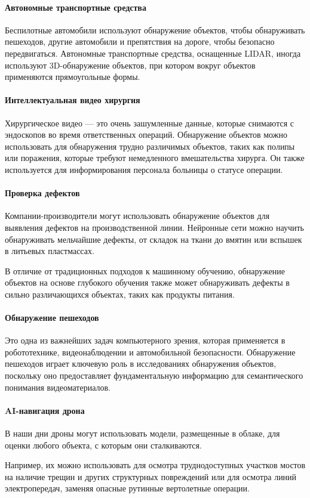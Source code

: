\paragraph{Автономные транспортные средства}
Беспилотные автомобили используют обнаружение объектов, чтобы обнаруживать пешеходов, другие автомобили и препятствия на дороге, чтобы безопасно передвигаться. Автономные транспортные средства, оснащенные LIDAR, иногда используют 3D-обнаружение объектов, при котором вокруг объектов применяются прямоугольные формы.

\paragraph{Интеллектуальная видео хирургия}
Хирургическое видео — это очень зашумленные данные, которые снимаются с эндоскопов во время ответственных операций. Обнаружение объектов можно использовать для обнаружения трудно различимых объектов, таких как полипы или поражения, которые требуют немедленного вмешательства хирурга. Он также используется для информирования персонала больницы о статусе операции.

\paragraph{Проверка дефектов}
Компании-производители могут использовать обнаружение объектов для выявления дефектов на производственной линии. Нейронные сети можно научить обнаруживать мельчайшие дефекты, от складок на ткани до вмятин или вспышек в литьевых пластмассах.

В отличие от традиционных подходов к машинному обучению, обнаружение объектов на основе глубокого обучения также может обнаруживать дефекты в сильно различающихся объектах, таких как продукты питания.

\paragraph{Обнаружение пешеходов}
Это одна из важнейших задач компьютерного зрения, которая применяется в робототехнике, видеонаблюдении и автомобильной безопасности. Обнаружение пешеходов играет ключевую роль в исследованиях обнаружения объектов, поскольку оно предоставляет фундаментальную информацию для семантического понимания видеоматериалов.

\paragraph{AI-навигация дрона}
В наши дни дроны могут использовать модели, размещенные в облаке, для оценки любого объекта, с которым они сталкиваются.

Например, их можно использовать для осмотра труднодоступных участков мостов на наличие трещин и других структурных повреждений или для осмотра линий электропередач, заменяя опасные рутинные вертолетные операции.
